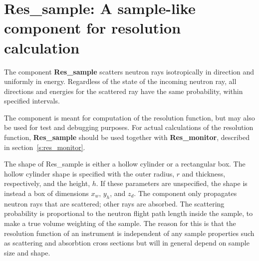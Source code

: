 \section{Res\_sample: A sample-like component for resolution calculation}
\label{s:res_sample}


The component \textbf{Res\_sample} scatters neutron rays isotropically
in direction and uniformly in energy.
Regardless of the state of the incoming neutron ray,
all directions and energies for the scattered ray have the same probability,
within specified intervals.

The component is meant
for computation of the resolution function, but may also be used
for test and debugging purposes. For actual calculations of the resolution
function, {\bf Res\_sample} should be used
together with \textbf{Res\_monitor}, described in
section~\ref{s:res_monitor}.

The shape of {\rm Res\_sample} is either a hollow cylinder
or a rectangular box.
The hollow cylinder shape is
specified with the outer radius, $r$ and thickness,
respectively, and the height, $h$.
If these parameters are unspecified,
the shape is instead a box of dimensions $x_w$, $y_h$, and $z_d$.
%
%
The component only propagates neutron rays that are scattered;
other rays are absorbed. The scattering probability is proportional to the neutron
flight path length inside the sample, to make a true volume weighting
of the sample. The reason for this is that the resolution
function of an instrument is independent of any sample properties
such as scattering and absorbtion cross sections but will in general
depend on sample size and shape.

